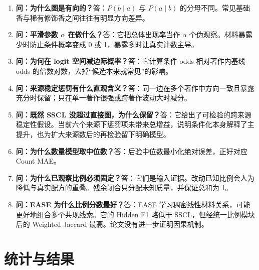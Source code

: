 \documentclass[UTF8,11pt,openany,fontset=none]{ctexbook}
\newcommand{\SSCL}{\textsc{SSCL}}
\begin{document}
\begin{enumerate}[resume]
\item \textbf{问：为什么图是有向的？}\quad 答：$P(b\mid a)$ 与 $P(a\mid b)$ 的分母不同。常见基础香与稀有修饰香之间往往有明显方向差异。
\item \textbf{问：平滑参数 $\alpha$ 在做什么？}\quad 答：它把总体出现率当作 $\alpha$ 个伪观察。材料暴露少时防止条件概率变成 0 或 1，暴露多时让真实计数主导。
\item \textbf{问：为何在 logit 空间减边际概率？}\quad 答：它计算条件 odds 相对著作内基线 odds 的倍数对数，去掉“候选本来就常见”的影响。
\item \textbf{问：来源稳定惩罚有什么直观含义？}\quad 答：同一边在多个著作中方向一致且暴露充分时保留；只在单一著作很强或跨著作波动大时减分。
\item \textbf{问：既然 \SSCL{} 没超过直接图，为什么保留？}\quad 答：它给出了可检验的跨来源稳定性假设。当前六个来源下惩罚项未带来总增益，说明条件化本身解释了主提升，也为扩大来源数后的再检验留下明确模型。
\item \textbf{问：为什么数量模型取中位数？}\quad 答：后验中位数最小化绝对误差，正好对应 Count MAE。
\item \textbf{问：为什么已观察比例必须固定？}\quad 答：它们是输入证据。改动已知比例会人为降低与真实配方的重叠。残余闭合只分配未知质量，并保证总和为 1。
\item \textbf{问：EASE 为什么比例分数最好？}\quad 答：EASE 学习稠密线性材料关系，可能更好地组合多个共现线索。它的 Hidden F1 略低于 \SSCL{}，但经统一比例模块后的 Weighted Jaccard 最高。论文没有进一步证明因果机制。
\end{enumerate}

\section{统计与结果}
\end{document}
